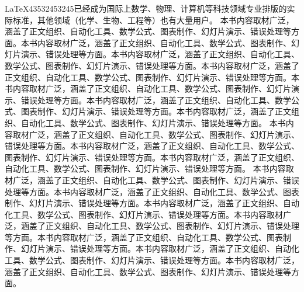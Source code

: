 \documentclass[UTF8]{ctexart}
\begin{document}
\begin{multicols}{2}		
\LaTeX 43532453245已经成为国际上数学、物理、计算机等科技领域专业排版的实际标准，其他领域（化学、生物、工程等）也有大量用户。				本书内容取材广泛，涵盖了正文组织、自动化工具、数学公式、图表制作、幻灯片演示、错误处理等方面。本书内容取材广泛，涵盖了正文组织、自动化工具、数学公式、图表制作、幻灯片演示、错误处理等方面。本书内容取材广泛，涵盖了正文组织、自动化工具、数学公式、图表制作、幻灯片演示、错误处理等方面。本书内容取材广泛，涵盖了正文组织、自动化工具、数学公式、图表制作、幻灯片演示、错误处理等方面。本书内容取材广泛，涵盖了正文组织、自动化工具、数学公式、图表制作、幻灯片演示、错误处理等方面。本书内容取材广泛，涵盖了正文组织、自动化工具、数学公式、图表制作、幻灯片演示、错误处理等方面。本书内容取材广泛，涵盖了正文组织、自动化工具、数学公式、图表制作、幻灯片演示、错误处理等方面。				本书内容取材广泛，涵盖了正文组织、自动化工具、数学公式、图表制作、幻灯片演示、错误处理等方面。本书内容取材广泛，涵盖了正文组织、自动化工具、数学公式、图表制作、幻灯片演示、错误处理等方面。本书内容取材广泛，涵盖了正文组织、自动化工具、数学公式、图表制作、幻灯片演示、错误处理等方面。				本书内容取材广泛，涵盖了正文组织、自动化工具、数学公式、图表制作、幻灯片演示、错误处理等方面。本书内容取材广泛，涵盖了正文组织、自动化工具、数学公式、图表制作、幻灯片演示、错误处理等方面。本书内容取材广泛，涵盖了正文组织、自动化工具、数学公式、图表制作、幻灯片演示、错误处理等方面。本书内容取材广泛，涵盖了正文组织、自动化工具、数学公式、图表制作、幻灯片演示、错误处理等方面。本书内容取材广泛，涵盖了正文组织、自动化工具、数学公式、图表制作、幻灯片演示、错误处理等方面。本书内容取材广泛，涵盖了正文组织、自动化工具、数学公式、图表制作、幻灯片演示、错误处理等方面。本书内容取材广泛，涵盖了正文组织、自动化工具、数学公式、图表制作、幻灯片演示、错误处理等方面。	
\end{multicols}
\end{document}
